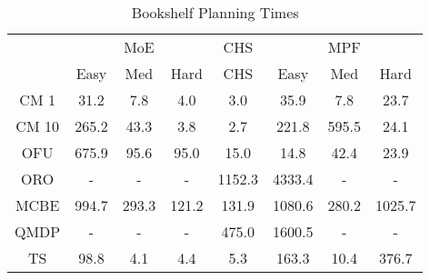 \begin{table}[]
\centering
\begin{tabular}{|c|c|c|c|c|c|c|c|}
\hline
& \multicolumn{3}{c|}{MoE} & CHS & \multicolumn{3}{c|}{MPF} 
 \\ 
 & Easy & Med & Hard & CHS & Easy & Med & Hard\\\hline
CM 1 &  31.2 &   7.8 &   4.0 &   3.0 &  35.9 &   7.8 &  23.7\\
\hline
CM 10 & 265.2 &  43.3 &   3.8 &   2.7 & 221.8 & 595.5 &  24.1\\
\hline
OFU & 675.9 &  95.6 &  95.0 &  15.0 &  14.8 &  42.4 &  23.9\\
\hline
ORO & - & - & - & 1152.3 & 4333.4 & - & -\\
\hline
MCBE & 994.7 & 293.3 & 121.2 & 131.9 & 1080.6 & 280.2 & 1025.7\\
\hline
QMDP & - & - & - & 475.0 & 1600.5 & - & -\\
\hline
TS &  98.8 &   4.1 &   4.4 &   5.3 & 163.3 &  10.4 & 376.7\\
\hline
\end{tabular}
\caption{Bookshelf Planning Times}
\label{tab:experiment_Bookshelf_time}
\end{table}
